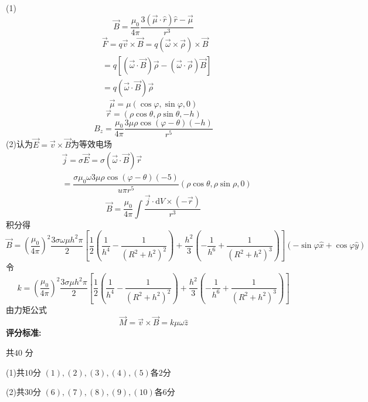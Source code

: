 \documentclass{article}
\begin{document}
\[\]
(1)
\[
\vec{B }=\dfrac{\mu _{0}}{4\pi }\dfrac{3\left( \vec{\mu }\cdot \hat{r}\right) \hat{r}-\vec{\mu }}{r^{3}}
\tag{1}\]
\[
\begin{aligned}
&\vec{F}=q\vec{v}\times\vec{B}=q(\vec{\omega}\times\vec{\rho})\times\vec{B}\\
&=q\left[\left(\vec{\omega}\cdot\vec{B}\right)\vec{\rho}-\left(\vec{\omega}\cdot\vec{\rho}\right)\vec{B}\right]\\
&=q\left(\vec{\omega}\cdot\vec{B}\right)\vec{\rho}
\end{aligned}
\tag{2}\]
\[
\vec{\mu}=\mu\left(\cos \varphi,\sin \varphi,0\right)
\tag{3}\]
\[
\vec{r}=\left(\rho\cos\theta,\rho\sin\theta,-h\right)
\tag{4}\]
\[
B_z=\frac{\mu_0}{4\pi}\frac{3\mu\rho\cos(\varphi-\theta)(-h)}{r^5}
\tag{5}\]
(2)认为$\vec{E}=\vec{v}\times\vec{B}$为等效电场
\[
\begin{aligned}
&\vec{j}=\sigma\vec{E}=\sigma(\vec{\omega}\cdot\vec{B})\vec{r}   \\
&=\dfrac{\sigma\mu_0\omega3\mu\rho\cos(\varphi-\theta)(-5)}{u\pi r^5}(\rho \cos\theta,\rho\sin \rho,0)
\end{aligned}
\tag{6}\]
\[
\vec{B}=\frac{\mu_0}{4\pi}\int\dfrac{\vec{j}\cdot\mathrm{d}V\times(-\vec{r})}{r^3}
\tag{7}\]
积分得
\[
\vec{B}=\left(\dfrac{\mu_0}{4\pi}\right)^2\frac{3\sigma\omega\mu h^2\pi}{2}\left[\dfrac{1}{2}\left(\dfrac{1}{h^4}-\dfrac{1}{\left(R^2+h^2\right)^2}\right)+\dfrac{h^2}{3}\left(-\dfrac{1}{h^6}+\dfrac{1}{\left(R^2+h^2\right)^3}\right)\right](-\sin\varphi \hat{x}+\cos \varphi \hat{y})
\tag{8}\]
令
\[
k=\left(\dfrac{\mu_0}{4\pi}\right)^2\frac{3\sigma\mu h^2\pi}{2}\left[\dfrac{1}{2}\left(\dfrac{1}{h^4}-\dfrac{1}{\left(R^2+h^2\right)^2}\right)+\dfrac{h^2}{3}\left(-\dfrac{1}{h^6}+\dfrac{1}{\left(R^2+h^2\right)^3}\right)\right]
\tag{9}\]
由力矩公式
\[
\vec{M}=\vec{v}\times\vec{B}=k\mu\omega\hat{z}
\tag{10}\]
\textbf{评分标准:}\par
共$40$ 分\par
(1)共$10$分 $(1),(2),(3),(4),(5)$各$2$分\par
(2)共$30$分 $(6),(7),(8),(9),(10)$各$6$分\par
\end{document}
